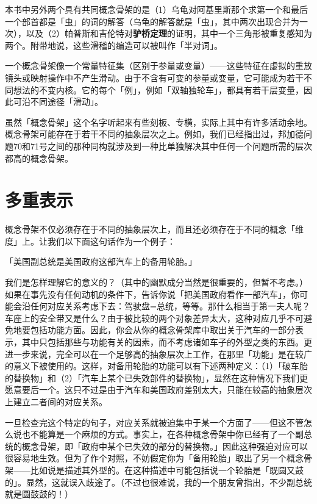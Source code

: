\documentclass[
  12pt,
  twoside,
  openright,
  oldfontcommands,
]{memoir}
\newcommand{\heititext}[1]{{\heifamily\bfseries #1}}
\begin{document}
本书中另外两个具有共同概念骨架的是（1）乌龟对阿基里斯那个求第一个和最后一个部首都是「虫」的词的解答（乌龟的解答就是「虫」，其中两次出现合并为一次），以及（2）帕普斯和吉伦特对\heititext{驴桥定理}的证明，其中一个三角形被重复感知为两个。附带地说，这些滑稽的编造可以被叫作「半对词」。

一个概念骨架像一个常量特征集（区别于参量或变量）------这些特征在虚拟的重放镜头或映射操作中不产生滑动。由于不含有可变的参量或变量，它可能成为若干不同想法的不变内核。它的每个「例」，例如「双轴独轮车」，都具有若干层变量，因此可沿不同途径「滑动」。

虽然「概念骨架」这个名字听起来有些刻板、专横，实际上其中有许多活动余地。概念骨架可能存在于若干不同的抽象层次之上。例如，我们已经指出过，邦加德问题70和71号之间的那种同构就涉及到一种比单独解决其中任何一个问题所需的层次都高的概念骨架。

\section{多重表示}

概念骨架不仅必须存在于不同的抽象层次上，而且还必须存在于不同的概念「维度」上。让我们以下面这句话作为一个例子：

「美国副总统是美国政府这部汽车上的备用轮胎。」

我们是怎样理解它的意义的？（其中的幽默成分当然是很重要的，但暂不考虑。）如果在事先没有任何动机的条件下，告诉你说「把美国政府看作一部汽车」，你可能会沿任何对应关系考虑下去：驾驶盘=总统，等等。那什么相当于第一夫人呢？车座上的安全带又是什么？由于被比较的两个对象差异太大，这种对应几乎不可避免地要包括功能方面。因此，你会从你的概念骨架库中取出关于汽车的一部分表示，其中只包括那些与功能有关的因素，而不考虑诸如车子的外型之类的东西。更进一步来说，完全可以在一个足够高的抽象层次上工作，在那里「功能」是在较广的意义下被使用的。这样，对备用轮胎的功能可以有下述两种定义：（1）「破车胎的替换物」和（2）「汽车上某个已失效部件的替换物」，显然在这种情况下我们更愿意要后一个。这只不过是由于汽车和美国政府差别太大，只能在较高的抽象层次上建立二者间的对应关系。

一旦检查完这个特定的句子，对应关系就被迫集中于某一个方面了------但这不管怎么说也不能算是一个麻烦的方式。事实上，在各种概念骨架中你已经有了一个副总统的概念骨架，即「政府中某个已失效的部分的替换物。」因此这种强迫对应可以很容易地生效。但为了作个对照，不妨假定你为「备用轮胎」取出了另一个概念骨架------比如说是描述其外型的。在这种描述中可能包括说一个轮胎是「既圆又鼓的」。显然，这就误入歧途了。（不过也很难说，我的一个朋友曾指出，不少副总统就是圆鼓鼓的！）
\end{document}

